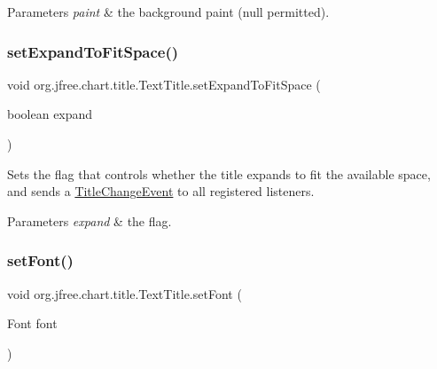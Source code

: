 \begin{DoxyParams}{Parameters}
{\em paint} & the background paint ({\ttfamily null} permitted). \\
\hline
\end{DoxyParams}
\mbox{\label{classorg_1_1jfree_1_1chart_1_1title_1_1_text_title_a446efcd80f6830249c5a9baef561119b}} 
\subsubsection{\texorpdfstring{set\+Expand\+To\+Fit\+Space()}{setExpandToFitSpace()}}
{\footnotesize\ttfamily void org.\+jfree.\+chart.\+title.\+Text\+Title.\+set\+Expand\+To\+Fit\+Space (\begin{DoxyParamCaption}\item[{boolean}]{expand }\end{DoxyParamCaption})}

Sets the flag that controls whether the title expands to fit the available space, and sends a \mbox{\hyperlink{}{Title\+Change\+Event}} to all registered listeners.


\begin{DoxyParams}{Parameters}
{\em expand} & the flag. \\
\hline
\end{DoxyParams}
\mbox{\label{classorg_1_1jfree_1_1chart_1_1title_1_1_text_title_a7f3d4b6549f6779a418e98e1e50aea62}} 
\subsubsection{\texorpdfstring{set\+Font()}{setFont()}}
{\footnotesize\ttfamily void org.\+jfree.\+chart.\+title.\+Text\+Title.\+set\+Font (\begin{DoxyParamCaption}\item[{Font}]{font }\end{DoxyParamCaption})}


